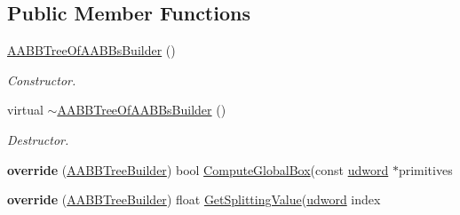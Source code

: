 \subsection*{Public Member Functions}
\begin{DoxyCompactItemize}
\item 
\hyperlink{classAABBTreeOfAABBsBuilder_a108af2bfc576e2561eaee38fdabc2452}{A\+A\+B\+B\+Tree\+Of\+A\+A\+B\+Bs\+Builder} ()\hypertarget{classAABBTreeOfAABBsBuilder_a108af2bfc576e2561eaee38fdabc2452}{}\label{classAABBTreeOfAABBsBuilder_a108af2bfc576e2561eaee38fdabc2452}

\begin{DoxyCompactList}\small\item\em Constructor. \end{DoxyCompactList}\item 
virtual \hyperlink{classAABBTreeOfAABBsBuilder_a7ecceb64442ad56862a5cd766a6be82e}{$\sim$\+A\+A\+B\+B\+Tree\+Of\+A\+A\+B\+Bs\+Builder} ()\hypertarget{classAABBTreeOfAABBsBuilder_a7ecceb64442ad56862a5cd766a6be82e}{}\label{classAABBTreeOfAABBsBuilder_a7ecceb64442ad56862a5cd766a6be82e}

\begin{DoxyCompactList}\small\item\em Destructor. \end{DoxyCompactList}\item 
{\bfseries override} (\hyperlink{classAABBTreeBuilder}{A\+A\+B\+B\+Tree\+Builder}) bool \hyperlink{classAABBTreeBuilder_adde85a9974ea5dc2c74fd851e11abf75}{Compute\+Global\+Box}(const \hyperlink{IceTypes_8h_a44c6f1920ba5551225fb534f9d1a1733}{udword} $\ast$primitives\hypertarget{classAABBTreeOfAABBsBuilder_a4dda34eb7aeb4e9e423eebc0968e4cd1}{}\label{classAABBTreeOfAABBsBuilder_a4dda34eb7aeb4e9e423eebc0968e4cd1}

\item 
{\bfseries override} (\hyperlink{classAABBTreeBuilder}{A\+A\+B\+B\+Tree\+Builder}) float \hyperlink{classAABBTreeBuilder_acf08d2d4275763e25585aa240e641be1}{Get\+Splitting\+Value}(\hyperlink{IceTypes_8h_a44c6f1920ba5551225fb534f9d1a1733}{udword} index\hypertarget{classAABBTreeOfAABBsBuilder_acb1b48ca7ac33204ea27223270e67323}{}\label{classAABBTreeOfAABBsBuilder_acb1b48ca7ac33204ea27223270e67323}

\end{DoxyCompactItemize}
